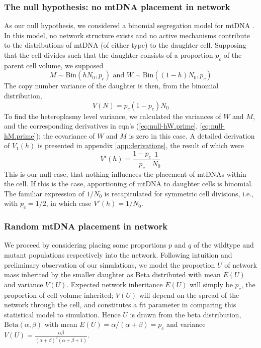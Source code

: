 \documentclass{article}
\newcommand{\be}{\begin{equation}}
\newcommand{\ee}{\end{equation}}
\begin{document}
\subsubsection*{The null hypothesis: no mtDNA placement in network}
As our null hypothesis, we considered a binomial segregation model for mtDNA \citep{johnston2019varied}. In this model, no network structure exists and no active mechanisms contribute to the distributions of mtDNA (of either type) to the daughter cell. Supposing that the cell divides such that the daughter consists of a proportion $p_c$ of the parent cell volume, we supposed
\be\label{eq:model-null}
M\sim \mathrm{Bin}(hN_0,p_c) \text{ and } W\sim\mathrm{Bin}((1-h)N_0,p_c)
\ee
The copy number variance of the daughter is then, from the binomial distribution,
\begin{equation}\label{eq:vn-null}
    V(N)=p_c(1-p_c)N_0
\end{equation}
To find the heteroplasmy level variance, we calculated the variances of $W$ and $M$, and the corresponding derivatives in eqn's (\ref{eq:null-hW.prime}, \ref{eq:null-hM.prime}); the covariance of $W$ and $M$ is zero in this case. A detailed derivation of $V_1(h)$ is presented in appendix \ref{app:derivations}, the result of which were
\begin{equation}\label{eq:vh-null}
V'(h)=\frac{1-p_c}{p_c} \frac{1}{N_0}
\end{equation}
This is our null case, that nothing influences the placement of mtDNAs within the cell. If this is the case, apportioning of mtDNA to daughter cells is binomial. The familiar expression of $1/N_0$ is recapitulated for symmetric cell divisions, i.e., with $p_c=1/2$, in which case $V'(h)=1/N_0$.

\subsubsection*{Random mtDNA placement in network}
We proceed by considering placing some proportions $p$ and $q$ of the wildtype and mutant populations respectively into the network. Following intuition and preliminary observation of our simulations, we model the proportion $U$ of network mass inherited by the smaller daughter as Beta distributed with mean $E(U)$ and variance $V(U)$. Expected network inheritance $E(U)$ will simply be $p_c$, the proportion of cell volume inherited; $V(U)$ will depend on the spread of the network through the cell, and constitutes a fit parameter in comparing this statistical model to simulation. Hence $U$ is drawn from the beta distribution, $\mathrm{Beta}(\alpha,\beta)$ with mean $E(U) = \alpha/(\alpha+\beta) = p_c$ and variance $V(U) = \frac{\alpha\beta}{(\alpha+\beta)^2(\alpha+\beta+1)}$.
\end{document}
